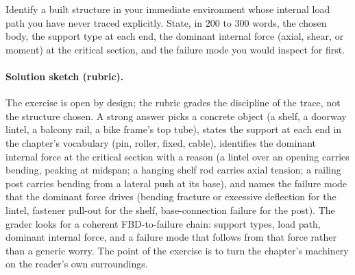 \begin{exercise}
Identify a built structure in your immediate environment whose
internal load path you have never traced explicitly. State, in
$200$ to $300$ words, the chosen body, the support type at each
end, the dominant internal force (axial, shear, or moment) at the
critical section, and the failure mode you would inspect for first.

\paragraph{Solution sketch (rubric).} The exercise is open by design;
the rubric grades the discipline of the trace, not the structure chosen.
A strong answer picks a concrete object (a shelf, a doorway lintel, a
balcony rail, a bike frame's top tube), states the support at each end in
the chapter's vocabulary (pin, roller, fixed, cable), identifies the
dominant internal force at the critical section with a reason (a lintel
over an opening carries bending, peaking at midspan; a hanging shelf rod
carries axial tension; a railing post carries bending from a lateral
push at its base), and names the failure mode that the dominant force
drives (bending fracture or excessive deflection for the lintel,
fastener pull-out for the shelf, base-connection failure for the post).
The grader looks for a coherent FBD-to-failure chain: support types,
load path, dominant internal force, and a failure mode that follows from
that force rather than a generic worry. The point of the exercise is to
turn the chapter's machinery on the reader's own surroundings.
\end{exercise}
